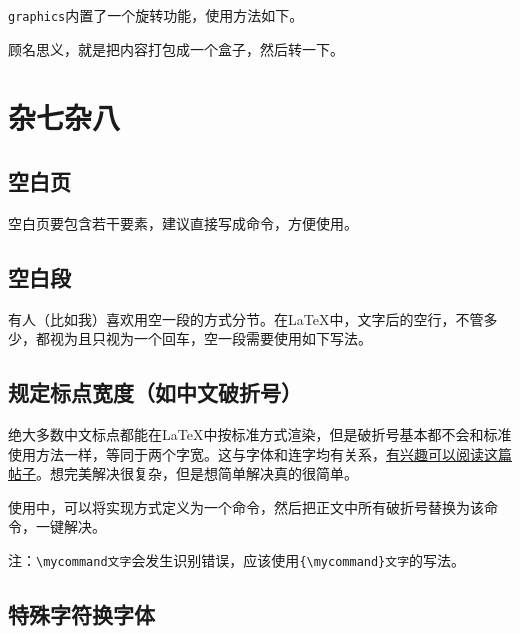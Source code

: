 \documentclass[10pt,openany]{book}
\begin{document}
\texttt{graphics}内置了一个旋转功能，使用方法如下。



顾名思义，就是把内容打包成一个盒子，然后转一下。

\chapter{杂七杂八}

\section{空白页}

空白页要包含若干要素，建议直接写成命令，方便使用。



\section{空白段}
\label{blankpar}

有人（比如我）喜欢用空一段的方式分节。在\LaTeX 中，文字后的空行，不管多少，都视为且只视为一个回车，空一段需要使用如下写法。



\section{规定标点宽度（如中文破折号）}
\label{chsline}

绝大多数中文标点都能在\LaTeX 中按标准方式渲染，但是破折号基本都不会和标准使用方法一样，等同于两个字宽。这与字体和连字均有关系，\href{https://github.com/CTeX-org/ctex-kit/issues/382}{有兴趣可以阅读这篇帖子}。想完美解决很复杂，但是想简单解决真的很简单。



使用中，可以将实现方式定义为一个命令，然后把正文中所有破折号替换为该命令，一键解决。

注：\texttt{\textbackslash{}mycommand\hspace{-0.1em}文字}会发生识别错误，应该使用\texttt{\{\textbackslash{}mycommand\}文字}的写法。

\section{特殊字符换字体}
\end{document}
